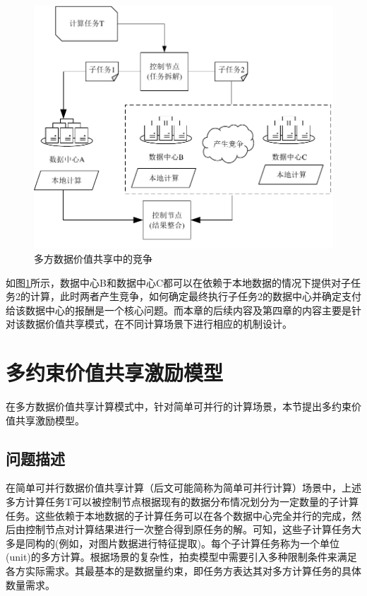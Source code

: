 \documentclass[promaster]{thesis-uestc}
\begin{document}
\begin{figure}[h]   
\includegraphics{pic/yuanweijili.pdf}
\caption{多方数据价值共享中的竞争}
\label{yuanweijili}
\end{figure}

如图\ref{yuanweijili}所示，数据中心B和数据中心C都可以在依赖于本地数据的情况下提供对子任务2的计算，此时两者产生竞争，如何确定最终执行子任务2的数据中心并确定支付给该数据中心的报酬是一个核心问题。而本章的后续内容及第四章的内容主要是针对该数据价值共享模式，在不同计算场景下进行相应的机制设计。

\section{多约束价值共享激励模型}
在多方数据价值共享计算模式中，针对简单可并行的计算场景，本节提出多约束价值共享激励模型。
\subsection{问题描述}

在简单可并行数据价值共享计算（后文可能简称为简单可并行计算）场景中，上述多方计算任务T可以被控制节点根据现有的数据分布情况划分为一定数量的子计算任务。这些依赖于本地数据的子计算任务可以在各个数据中心完全并行的完成，然后由控制节点对计算结果进行一次整合得到原任务的解。可知，这些子计算任务大多是同构的(例如，对图片数据进行特征提取)。每个子计算任务称为一个单位(unit)的多方计算。根据场景的复杂性，拍卖模型中需要引入多种限制条件来满足各方实际需求。其最基本的是数据量约束，即任务方表达其对多方计算任务的具体数量需求。
\end{document}
